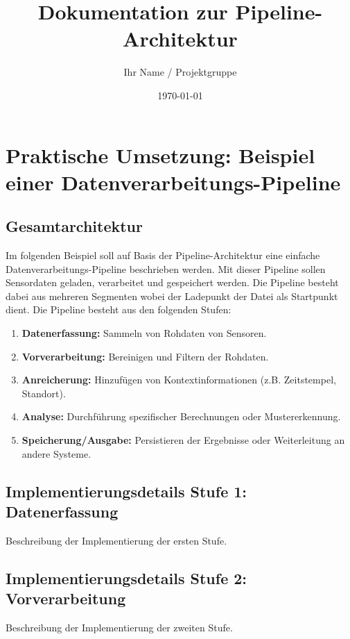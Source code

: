 \documentclass[a4paper]{article} %
\title{Dokumentation zur Pipeline-Architektur}
\author{Ihr Name / Projektgruppe}
\date{\today}
\begin{document}
\maketitle %
\tableofcontents %
\newpage

\section{Praktische Umsetzung: Beispiel einer Datenverarbeitungs-Pipeline}
\subsection{Gesamtarchitektur}
Im folgenden Beispiel soll auf Basis der Pipeline-Architektur eine einfache Datenverarbeitungs-Pipeline beschrieben werden. Mit dieser Pipeline sollen Sensordaten geladen, verarbeitet und gespeichert werden. Die Pipeline besteht dabei aus mehreren Segmenten wobei der Ladepunkt der Datei als Startpunkt dient.
Die Pipeline besteht aus den folgenden Stufen:
\begin{enumerate}
    \item \textbf{Datenerfassung:} Sammeln von Rohdaten von Sensoren.
    \item \textbf{Vorverarbeitung:} Bereinigen und Filtern der Rohdaten.
    \item \textbf{Anreicherung:} Hinzufügen von Kontextinformationen (z.B. Zeitstempel, Standort).
    \item \textbf{Analyse:} Durchführung spezifischer Berechnungen oder Mustererkennung.
    \item \textbf{Speicherung/Ausgabe:} Persistieren der Ergebnisse oder Weiterleitung an andere Systeme.
\end{enumerate}
\blindtext[3]
\lipsum[8-10]

\subsection{Implementierungsdetails Stufe 1: Datenerfassung}
Beschreibung der Implementierung der ersten Stufe.
\blindtext[2]
\lipsum[11]

\subsection{Implementierungsdetails Stufe 2: Vorverarbeitung}
Beschreibung der Implementierung der zweiten Stufe.
\blindtext[2]
\lipsum[12]
\end{document}
